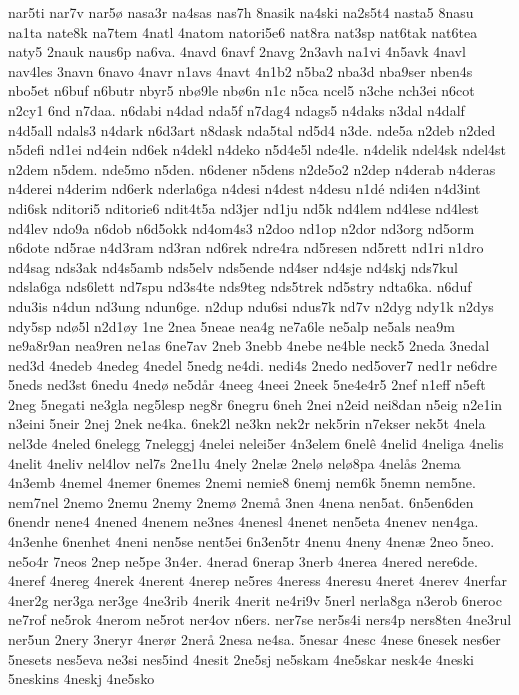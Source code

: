 {nar5ti
nar7v
nar5^^f8
nasa3r
na4sas
nas7h
8nasik
na4ski
na2s5t4
nasta5
8nasu
na1ta
nate8k
na7tem
4natl
4natom
natori5e6
nat8ra
nat3sp
nat6tak
nat6tea
naty5
2nauk
naus6p
na6va.
4navd
6navf
2navg
2n3avh
na1vi
4n5avk
4navl
nav4les
3navn
6navo
4navr
n1avs
4navt
4n1b2
n5ba2
nba3d
nba9ser
nben4s
nbo5et
n6buf
n6butr
nbyr5
nb^^f89le
nb^^f86n
n1c
n5ca
ncel5
n3che
nch3ei
n6cot
n2cy1
6nd
n7daa.
n6dabi
n4dad
nda5f
n7dag4
ndags5
n4daks
n3dal
n4dalf
n4d5all
ndals3
n4dark
n6d3art
n8dask
nda5tal
nd5d4
n3de.
nde5a
n2deb
n2ded
n5defi
nd1ei
nd4ein
nd6ek
n4dekl
n4deko
n5d4e5l
nde4le.
n4delik
ndel4sk
ndel4st
n2dem
n5dem.
nde5mo
n5den.
n6dener
n5dens
n2de5o2
n2dep
n4derab
n4deras
n4derei
n4derim
nd6erk
nderla6ga
n4desi
n4dest
n4desu
n1d^^e9
ndi4en
n4d3int
ndi6sk
nditori5
nditorie6
ndit4t5a
nd3jer
nd1ju
nd5k
nd4lem
nd4lese
nd4lest
nd4lev
ndo9a
n6dob
n6d5okk
nd4om4s3
n2doo
nd1op
n2dor
nd3org
nd5orm
n6dote
nd5rae
n4d3ram
nd3ran
nd6rek
ndre4ra
nd5resen
nd5rett
nd1ri
n1dro
nd4sag
nds3ak
nd4s5amb
nds5elv
nds5ende
nd4ser
nd4sje
nd4skj
nds7kul
ndsla6ga
nds6lett
nd7spu
nd3s4te
nds9teg
nds5trek
nd5stry
ndta6ka.
n6duf
ndu3is
n4dun
nd3ung
ndun6ge.
n2dup
ndu6si
ndus7k
nd7v
n2dyg
ndy1k
n2dys
ndy5sp
nd^^f85l
n2d1^^f8y
1ne
2nea
5neae
nea4g
ne7a6le
ne5alp
ne5als
nea9m
ne9a8r9an
nea9ren
ne1as
6ne7av
2neb
3nebb
4nebe
ne4ble
neck5
2neda
3nedal
ned3d
4nedeb
4nedeg
4nedel
5nedg
ne4di.
nedi4s
2nedo
ned5over7
ned1r
ne6dre
5neds
ned3st
6nedu
4ned^^f8
ne5d^^e5r
4neeg
4neei
2neek
5ne4e4r5
2nef
n1eff
n5eft
2neg
5negati
ne3gla
neg5lesp
neg8r
6negru
6neh
2nei
n2eid
nei8dan
n5eig
n2e1in
n3eini
5neir
2nej
2nek
ne4ka.
6nek2l
ne3kn
nek2r
nek5rin
n7ekser
nek5t
4nela
nel3de
4neled
6nelegg
7neleggj
4nelei
nelei5er
4n3elem
6nel^^ea
4nelid
4neliga
4nelis
4nelit
4neliv
nel4lov
nel7s
2ne1lu
4nely
2nel^^e6
2nel^^f8
nel^^f88pa
4nel^^e5s
2nema
4n3emb
4nemel
4nemer
6nemes
2nemi
nemie8
6nemj
nem6k
5nemn
nem5ne.
nem7nel
2nemo
2nemu
2nemy
2nem^^f8
2nem^^e5
3nen
4nena
nen5at.
6n5en6den
6nendr
nene4
4nened
4nenem
ne3nes
4nenesl
4nenet
nen5eta
4nenev
nen4ga.
4n3enhe
6nenhet
4neni
nen5se
nent5ei
6n3en5tr
4nenu
4neny
4nen^^e6
2neo
5neo.
ne5o4r
7neos
2nep
ne5pe
3n4er.
4nerad
6nerap
3nerb
4nerea
4nered
nere6de.
4neref
4nereg
4nerek
4nerent
4nerep
ne5res
4neress
4neresu
4neret
4nerev
4nerfar
4ner2g
ner3ga
ner3ge
4ne3rib
4nerik
4nerit
ne4ri9v
5nerl
nerla8ga
n3erob
6neroc
ne7rof
ne5rok
4nerom
ne5rot
ner4ov
n6ers.
ner7se
ner5s4i
ners4p
ners8ten
4ne3rul
ner5un
2nery
3neryr
4ner^^f8r
2ner^^e5
2nesa
ne4sa.
5nesar
4nesc
4nese
6nesek
nes6er
5nesets
nes5eva
ne3si
nes5ind
4nesit
2ne5sj
ne5skam
4ne5skar
nesk4e
4neski
5neskins
4neskj
4ne5sko
}

